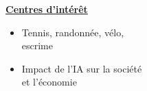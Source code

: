 \documentclass[letterpaper,10pt]{article}
\begin{document}
\begin{minipage}[t]{0.28\textwidth}
  \raggedright
  \textbf{\underline{Centres d'intérêt}}\\[-2pt]
  {\scriptsize
    \begin{itemize}[leftmargin=*,itemsep=1pt,parsep=0pt,topsep=0pt,partopsep=0pt]
      \item Tennis, randonnée, vélo, \\escrime
      \item Impact de l'IA sur la société \\et l'économie
    \end{itemize}
  }
\end{minipage}



\end{document}
